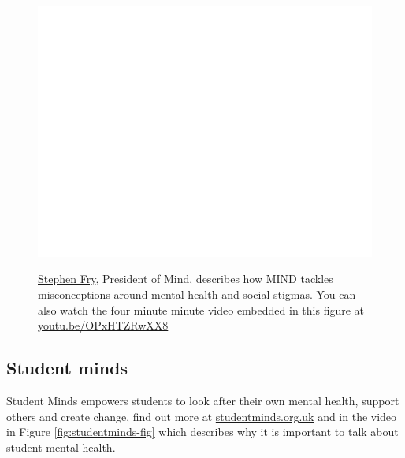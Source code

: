 \documentclass[
]{book}
\begin{document}
\begin{figure}

{\centering \href{https://www.youtube.com/embed/OPxHTZRwXX8}{\includegraphics[width=0.99\linewidth]{cdyf_files/figure-latex/stephenfry-fig-1} }

}

\caption{\href{https://en.wikipedia.org/wiki/Stephen_Fry}{Stephen Fry}, President of Mind, describes how MIND tackles misconceptions around mental health and social stigmas. You can also watch the four minute minute video embedded in this figure at \href{https://youtu.be/OPxHTZRwXX8}{youtu.be/OPxHTZRwXX8} \citep{youtube-we-are-mind}}\label{fig:stephenfry-fig}
\end{figure}



\hypertarget{studentminds}{%
\subsection{Student minds}\label{studentminds}}

Student Minds empowers students to look after their own mental health, support others and create change, find out more at \href{https://www.studentminds.org.uk}{studentminds.org.uk} and in the video in Figure \ref{fig:studentminds-fig} which describes why it is important to talk about student mental health.
\end{document}
